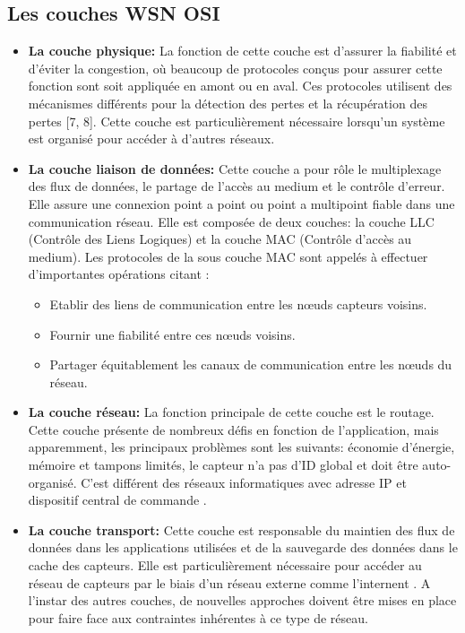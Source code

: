 \subsection{Les couches WSN OSI}
\begin{itemize}
	\item \textbf{La couche physique: }La fonction de cette couche est d'assurer la fiabilité et d’éviter la congestion, où beaucoup de protocoles conçus pour assurer cette fonction sont soit appliquée en amont ou en aval. Ces protocoles utilisent des mécanismes différents pour la détection des pertes et la récupération des pertes [7, 8]. Cette couche est particulièrement nécessaire lorsqu'un système est organisé pour accéder à d'autres réseaux.
	
	\item \textbf{La couche liaison de données: }Cette couche a pour rôle le multiplexage des flux de données, le partage de l’accès au medium et le contrôle d’erreur. Elle assure une connexion point a point ou point a multipoint fiable dans une communication réseau. \cite{bachir2010mac,meghan2009comparative} Elle est composée de deux couches: la couche LLC (Contrôle des Liens Logiques) et la couche MAC (Contrôle d’accès au medium). Les protocoles de la sous couche MAC sont appelés à effectuer d’importantes opérations citant :
	\begin{itemize}
		\item Etablir des liens de communication entre les nœuds capteurs voisins.
		\item Fournir une fiabilité entre ces nœuds voisins.
		\item Partager équitablement les canaux de communication entre les nœuds du 		réseau.
	\end{itemize}

	\item \textbf{La couche réseau: }La fonction principale de cette couche est le routage. Cette couche présente de nombreux défis en fonction de l’application, mais apparemment, les principaux problèmes sont les suivants: économie d’énergie, mémoire et tampons limités, le capteur n’a pas d’ID global et doit être auto-organisé. C’est différent des réseaux informatiques avec adresse IP et dispositif central de commande \cite{akyildiz2002wireless,akyildiz2007survey}.
	
	\item \textbf{La couche transport:  }Cette couche est responsable du maintien des flux de données dans les applications utilisées et de la sauvegarde des données dans le cache des capteurs. Elle est particulièrement nécessaire pour accéder au réseau de capteurs par le biais d’un réseau externe comme l’internent \cite{nieberg2003collaborative}. A l’instar des autres couches, de nouvelles approches doivent être mises en place pour faire face aux contraintes inhérentes à ce type de réseau.
	

\end{itemize}
